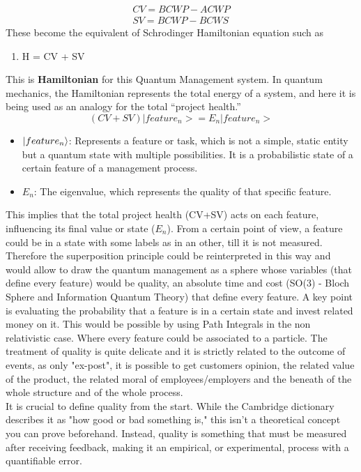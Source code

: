 \documentclass{article}
\begin{document}
\begin{align}
    CV = BCWP - ACWP\\
    SV = BCWP - BCWS
\end{align}
These become the equivalent of Schrodinger Hamiltonian equation such as
\begin{enumerate}
    \item H = CV + SV
\end{enumerate}
This is \textbf{Hamiltonian} for this Quantum Management system. In quantum mechanics, the Hamiltonian represents the total energy of a system, and here it is being used as an analogy for the total ``project health.''
\begin{equation}
    (CV + SV) |feature_n> = E_n |feature_n>
\end{equation}
\begin{itemize}
\item $\ket{feature_n}$: Represents a feature or task, which is not a simple, static entity but a quantum state with multiple possibilities. It is a probabilistic state of a certain feature of a management process.

\item $E_n$: The eigenvalue, which represents the quality of that specific feature.
\end{itemize}

This implies that the total project health (CV+SV) acts on each feature, influencing its final value or state ($E_n$).
From a certain point of view, a feature could be in a state with some labels as in an other, till it is not measured. Therefore the superposition principle could be reinterpreted in this way and would allow to draw the quantum management as a sphere whose variables (that define every feature) would be quality, an absolute time and cost (SO(3) - Bloch Sphere and Information Quantum Theory) that define every feature. A key point is evaluating the probability that a feature is in a certain state and invest related money on it. This would be possible by using Path Integrals in the non relativistic case. Where every feature could be associated to a particle.
The treatment of quality is quite delicate and it is strictly related to the outcome of events, as only "ex-post", it is possible to get customers opinion, the related value of the product, the related moral of employees/employers and the beneath of the whole structure and of the whole process.\\
It is crucial to define quality from the start. While the Cambridge dictionary describes it as "how good or bad something is," this isn't a theoretical concept you can prove beforehand. Instead, quality is something that must be measured after receiving feedback, making it an empirical, or experimental, process with a quantifiable error.
\newpage
\end{document}

